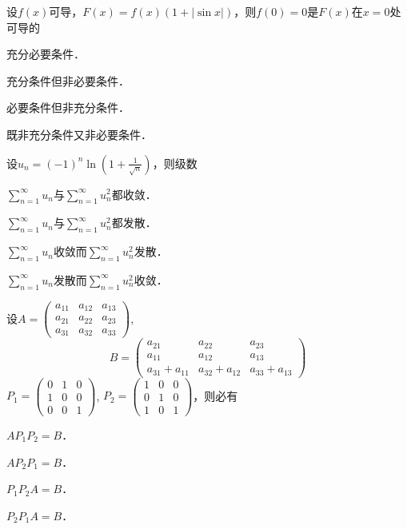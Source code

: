 \documentclass[plain,noanswer,medmath]{../../template/jnuexam}
\begin{document}
\begin{problem}
设$f(x)$可导，$F(x) = f(x)(1 + |\sin x|)$，则$f(0) = 0$是$F(x)$在$x = 0$处可导的\pickout{}
\begin{abcd}
\item 充分必要条件．                
\item 充分条件但非必要条件．
\item 必要条件但非充分条件．        
\item 既非充分条件又非必要条件．
\end{abcd}
\end{problem}


\begin{problem}
设$u_n = (- 1)^n\ln \left(1 + \frac{1}{\sqrt{n}} \right)$，则级数\pickout{}
\begin{abcd}
\item $\sum_{n = 1}^{\infty}u_n$与$\sum_{n = 1}^{\infty}u_n^2$都收敛．
\item $\sum_{n = 1}^{\infty}u_n$与$\sum_{n = 1}^{\infty}u_n^2$都发散．
\item $\sum_{n = 1}^{\infty}u_n$收敛而$\sum_{n = 1}^{\infty}u_n^2$发散．
\item $\sum_{n = 1}^{\infty}u_n$发散而$\sum_{n = 1}^{\infty}u_n^2$收敛．
\end{abcd}
\end{problem}


\begin{problem}
设$A = \begin{pmatrix}
  a_{11} & a_{12} & a_{13} \\
  a_{21} & a_{22} & a_{23} \\
  a_{31} & a_{32} & a_{33}
\end{pmatrix}$,
$$B = \begin{pmatrix}
           a_{21} &          a_{22} & a_{23} \\
           a_{11} &          a_{12} & a_{13} \\
  a_{31} + a_{11} & a_{32} + a_{12} & a_{33} + a_{13}
\end{pmatrix}$$
$P_1 = \begin{pmatrix}
  0 & 1 & 0 \\
  1 & 0 & 0 \\
  0 & 0 & 1
\end{pmatrix}$,
$P_2 = \begin{pmatrix}
  1 & 0 & 0 \\
  0 & 1 & 0 \\
  1 & 0 & 1
\end{pmatrix}$，则必有\pickout{}
\begin{abcd}
\item $AP_1P_2 = B$．  
\item $AP_2P_1 = B$．  
\item $P_1P_2 A = B$．  
\item $P_2P_1 A = B$．
\end{abcd}
\end{problem}
\end{document}
